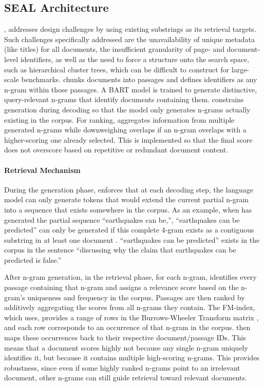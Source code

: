 \subsection{SEAL Architecture}

 \cite{michele-bevilacqua-autoregressive-search}, addresses  design challenges by using existing substrings as its retrieval targets. Such challenges specifically addressed are the unavailability of unique metadata (like titles) for all documents, the insufficient granularity of page- and document-level identifiers, as well as the need to force a structure onto the search space, such as hierarchical cluster trees, which can be difficult to construct for large-scale benchmarks. 
 chunks documents into passages and defines identifiers as any n-gram within those passages. A BART model is trained to generate distinctive, query-relevant n-grams that identify documents containing them.  constrains generation during decoding so that the model only generates n-grams actually existing in the corpus. For ranking,  aggregates information from multiple generated n-grams while downweighing overlaps if an n-gram overlaps with a higher-scoring one already selected. This is implemented so that the final score does not overscore based on repetitive or redundant document content.

\paragraph{Retrieval Mechanism}

During the generation phase,  enforces that at each decoding step, the language model can only generate tokens that would extend the current partial n-gram into a sequence that exists somewhere in the corpus. As an example, when  has generated the partial sequence ``earthquakes can be,'', ``earthquakes can be predicted'' can only be generated if this complete 4-gram exists as a contiguous substring in at least one document \cite{michele-bevilacqua-autoregressive-search}. ``earthquakes can be predicted'' exists in the corpus in the sentence ``discussing why the claim that earthquakes can be predicted is false.''

After n-gram generation, in the retrieval phase, for each n-gram,  identifies every passage containing that n-gram and assigns a relevance score based on the n-gram's uniqueness and frequency in the corpus.
Passages are then ranked by additively aggregating the scores from all n-grams they contain. The FM-index, which  uses, provides a range of rows in the Burrows-Wheeler Transform matrix \cite{burrows1994block}, and each row corresponds to an occurrence of that n-gram in the corpus.  then maps these occurrences back to their respective document/passage IDs. This means that a document scores highly not because any single n-gram uniquely identifies it, but because it contains multiple high-scoring n-grams. This provides robustness, since even if some highly ranked n-grams point to an irrelevant document, other n-grams can still guide retrieval toward relevant documents. 


